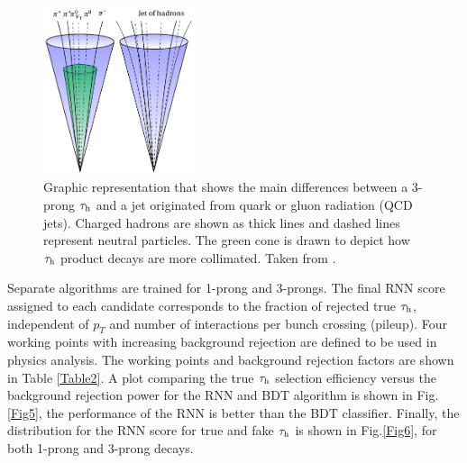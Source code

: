 \begin{figure}[H]
	\centering
	\includegraphics[width=0.4\textwidth]{figures/Fig4}
	\caption{Graphic representation that shows the main differences between a 3-prong $\tau_\text{h}$ and a jet originated from quark or gluon radiation (QCD jets). Charged hadrons are shown as thick lines and dashed lines represent neutral particles. The green cone is drawn to depict how $\tau_\text{h}$ product decays are more collimated. Taken from \cite{SamImage}.}
	\label{Fig4}
\end{figure}
Separate algorithms are trained for 1-prong and 3-prongs. The final RNN score assigned to each candidate corresponds to the fraction of rejected true $\tau_\text{h}$, independent of $p_T$ and number of interactions per bunch crossing (pileup). Four working points with increasing background rejection are defined to be used in physics analysis. The working points and background rejection factors are shown in Table \ref{Table2}. A plot comparing the true $\tau_\text{h}$ selection efficiency versus the background rejection power for the RNN and BDT algorithm is shown in Fig.\ref{Fig5}, the performance of the RNN is better than the BDT classifier. Finally, the distribution for the RNN score for true and fake $\tau_\text{h}$ is shown in Fig.\ref{Fig6}, for both 1-prong and 3-prong decays.
